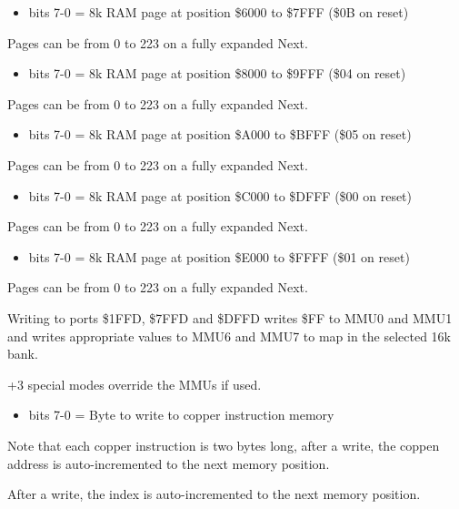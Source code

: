 \begin{itemize}
\item bits 7-0 = 8k RAM page at position \$6000 to \$7FFF (\$0B on
  reset)
\end{itemize}
Pages can be from 0 to 223 on a fully expanded Next.

\begin{itemize}
\item bits 7-0 = 8k RAM page at position \$8000 to \$9FFF (\$04 on
  reset)
\end{itemize}
Pages can be from 0 to 223 on a fully expanded Next.

\begin{itemize}
\item bits 7-0 = 8k RAM page at position \$A000 to \$BFFF (\$05 on
  reset)
\end{itemize}
Pages can be from 0 to 223 on a fully expanded Next.

\begin{itemize}
\item bits 7-0 = 8k RAM page at position \$C000 to \$DFFF (\$00 on
  reset)
\end{itemize}
Pages can be from 0 to 223 on a fully expanded Next.

\begin{itemize}
\item bits 7-0 = 8k RAM page at position \$E000 to \$FFFF (\$01 on
  reset)
\end{itemize}
Pages can be from 0 to 223 on a fully expanded Next.

Writing to ports \$1FFD, \$7FFD and \$DFFD writes \$FF to MMU0 and
MMU1 and writes appropriate values to MMU6 and MMU7 to map in the
selected 16k bank.

+3 special modes override the MMUs if used.

\begin{itemize}
\item bits 7-0 = Byte to write to copper instruction memory
\end{itemize}
Note that each copper instruction is two bytes long, after a write,
the coppen address is auto-incremented to the next memory position.

After a write, the index is auto-incremented to the next memory position.

